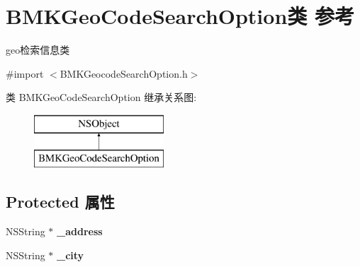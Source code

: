 \hypertarget{interface_b_m_k_geo_code_search_option}{\section{B\+M\+K\+Geo\+Code\+Search\+Option类 参考}
\label{interface_b_m_k_geo_code_search_option}
}


geo检索信息类  




{\ttfamily \#import $<$B\+M\+K\+Geocode\+Search\+Option.\+h$>$}

类 B\+M\+K\+Geo\+Code\+Search\+Option 继承关系图\+:\begin{figure}[H]
\begin{center}
\leavevmode
\includegraphics[height=2.000000cm]{interface_b_m_k_geo_code_search_option}
\end{center}
\end{figure}
\subsection*{Protected 属性}
\begin{DoxyCompactItemize}
\item 
\hypertarget{interface_b_m_k_geo_code_search_option_ad60b7404c92ec2b83741da90bd9c6375}{N\+S\+String $\ast$ {\bfseries \+\_\+address}}\label{interface_b_m_k_geo_code_search_option_ad60b7404c92ec2b83741da90bd9c6375}

\item 
\hypertarget{interface_b_m_k_geo_code_search_option_a3cd2ae3510249ea055adaa246e7947c3}{N\+S\+String $\ast$ {\bfseries \+\_\+city}}\label{interface_b_m_k_geo_code_search_option_a3cd2ae3510249ea055adaa246e7947c3}

\end{DoxyCompactItemize}
